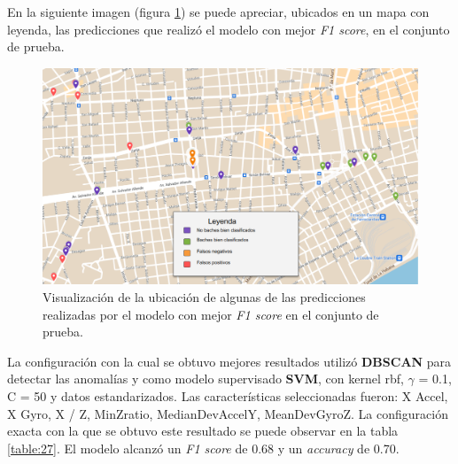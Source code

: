 	En la siguiente imagen (figura \ref{fig:14}) se puede apreciar, ubicados en un mapa con leyenda, las predicciones que realizó el modelo con mejor 
	\emph{F1 score}, en el conjunto de prueba.

	\newpage
	\begin{figure}[htb]
		\centering
		\includegraphics[scale = 0.4]{Graphics/map_point_predictions.png}
		\caption{Visualización de la ubicación de algunas de las predicciones realizadas por el modelo con mejor \emph{F1 score} en el conjunto de prueba.}
		\label{fig:14}
	\end{figure}
	
	La configuración con la cual se obtuvo mejores resultados utilizó \textbf{DBSCAN} para detectar las anomalías y como modelo
	supervisado \textbf{SVM}, con kernel rbf, $\gamma$ = 0.1, C = 50  y datos estandarizados. Las características seleccionadas fueron: 
	X Accel, X Gyro,  X / Z, MinZratio, MedianDevAccelY, MeanDevGyroZ. La configuración exacta con la que se obtuvo este resultado se
	puede observar en la tabla \ref{table:27}. El modelo alcanzó un \emph{F1 score} de 0.68 y un \emph{accuracy} de 0.70.

